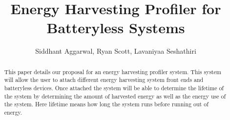 \documentclass[10pt, sigconf ]{acmart}
\title{Energy Harvesting Profiler for Batteryless Systems}
\author{Siddhant Aggarwal, Ryan Scott, Lavaniyaa Seshathiri}
\begin{document}
\begin{abstract}
 
 This paper details our proposal for an energy harvesting profiler system.
 This system will allow the user to attach different energy harvesting system front ends and batteryless devices.
 Once attached the system will be able to determine the lifetime of the system by determining the amount of harvested energy as well as the energy use of the system.
 Here lifetime means how long the system runs before running out of energy.
\end{abstract}

\maketitle




%




\end{document}

